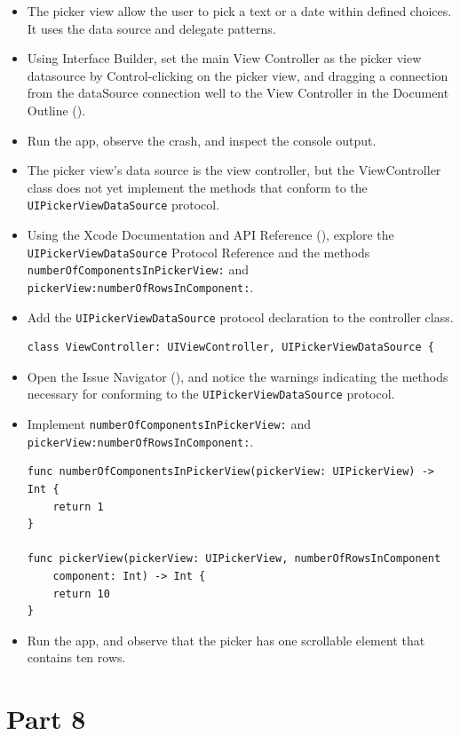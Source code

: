 \documentclass[a4paper,11pt]{scrartcl}
\begin{document}
\begin{itemize}
\item The picker view allow the user to pick a text or a date within defined choices. It uses the data source and delegate patterns.
\item Using Interface Builder, set the main View Controller as the picker view datasource by Control-clicking on the picker view, and dragging a connection from the dataSource connection well to the View Controller in the Document Outline ().
\item Run the app, observe the crash, and inspect the console output.
\item The picker view's data source is the view controller, but the ViewController class does not yet implement the methods that conform to the \texttt{UIPickerViewDataSource} protocol.
\item Using the Xcode Documentation and API Reference (), explore the \\\texttt{UIPickerViewDataSource} Protocol Reference and the methods \texttt{numberOfComponentsInPickerView:} and \texttt{pickerView:numberOfRowsInComponent:}.
\item Add the \texttt{UIPickerViewDataSource} protocol declaration to the controller class.
\begin{lstlisting}
class ViewController: UIViewController, UIPickerViewDataSource {
\end{lstlisting}
\item Open the Issue Navigator (), and notice the warnings indicating the methods necessary for conforming to the \texttt{UIPickerViewDataSource} protocol.
\item Implement \texttt{numberOfComponentsInPickerView:} and \texttt{pickerView:numberOfRowsInComponent:}.
\begin{lstlisting}
func numberOfComponentsInPickerView(pickerView: UIPickerView) -> Int {
	return 1
}

func pickerView(pickerView: UIPickerView, numberOfRowsInComponent
	component: Int) -> Int {
	return 10
}
\end{lstlisting}
\item Run the app, and observe that the picker has one scrollable element that contains ten rows.
\end{itemize}

\section*{Part 8}
\end{document}
